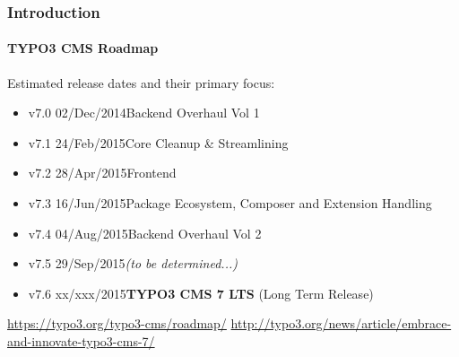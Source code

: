 \begin{frame}[fragile]
	\frametitle{Introduction}
	\framesubtitle{TYPO3 CMS Roadmap}

	Estimated release dates and their primary focus:

	\begin{itemize}
		\item v7.0 \tabto{1.0cm}02/Dec/2014\tabto{3.4cm}Backend Overhaul Vol 1
		\item v7.1 \tabto{1.0cm}24/Feb/2015\tabto{3.4cm}Core Cleanup \& Streamlining
		\item v7.2 \tabto{1.0cm}28/Apr/2015\tabto{3.4cm}Frontend

		\item
			\begingroup
				\color{typo3orange}
					v7.3 \tabto{1.0cm}16/Jun/2015\tabto{3.4cm}Package Ecosystem, Composer\newline
					\tabto{3.4cm}and Extension Handling
			\endgroup

		\item v7.4 \tabto{1.0cm}04/Aug/2015\tabto{3.4cm}Backend Overhaul Vol 2
		\item v7.5 \tabto{1.0cm}29/Sep/2015\tabto{3.4cm}\textit{(to be determined...)}
		\item v7.6 \tabto{1.0cm}xx/xxx/2015\tabto{3.4cm}\textbf{TYPO3 CMS 7 LTS} (Long Term Release)
	\end{itemize}

	\smaller
		\url{https://typo3.org/typo3-cms/roadmap/}\newline
		\url{http://typo3.org/news/article/embrace-and-innovate-typo3-cms-7/}
	\normalsize

\end{frame}

